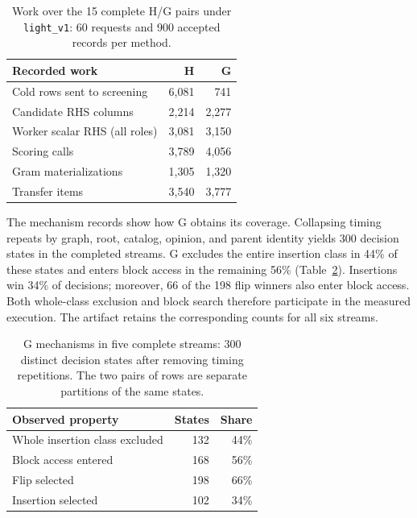 \begin{table}[t]
\centering
\caption{Work over the 15 complete H/G pairs under \texttt{light\_v1}: 60 requests and 900 accepted records per method.}
\label{tab:hg_work}
\begin{tabular}{@{}lrr@{}}
\toprule
Recorded work & H & G\\
\midrule
Cold rows sent to screening & 6,081 & 741\\
Candidate RHS columns & 2,214 & 2,277\\
Worker scalar RHS (all roles) & 3,081 & 3,150\\
Scoring calls & 3,789 & 4,056\\
Gram materializations & 1,305 & 1,320\\
Transfer items & 3,540 & 3,777\\
\bottomrule
\end{tabular}
\end{table}

The mechanism records show how G obtains its coverage. Collapsing timing repeats by graph, root, catalog, opinion, and parent identity yields 300 decision states in the completed streams. G excludes the entire insertion class in 44\% of these states and enters block access in the remaining 56\% (Table~\ref{tab:g_mechanism}). Insertions win 34\% of decisions; moreover, 66 of the 198 flip winners also enter block access. Both whole-class exclusion and block search therefore participate in the measured execution. The artifact retains the corresponding counts for all six streams.

\begin{table}[t]
\centering
\caption{G mechanisms in five complete streams: 300 distinct decision states after removing timing repetitions. The two pairs of rows are separate partitions of the same states.}
\label{tab:g_mechanism}
\begin{tabular}{@{}lrr@{}}
\toprule
Observed property & States & Share\\
\midrule
Whole insertion class excluded & 132 & 44\%\\
Block access entered & 168 & 56\%\\
\midrule
Flip selected & 198 & 66\%\\
Insertion selected & 102 & 34\%\\
\bottomrule
\end{tabular}
\end{table}



